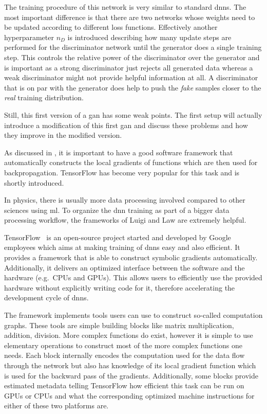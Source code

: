 The training procedure of this network is very similar to standard \glspl{dnn}. The most important difference is that there are two networks whose weights need to be updated according to different loss functions. Effectively another hyperparameter \(n_D\) is introduced describing how many update steps are performed for the discriminator network until the generator does a single training step. This controls the relative power of the discriminator over the generator and is important as a strong discriminator just rejects all generated data whereas a weak discriminator might not provide helpful information at all. A discriminator that is on par with the generator does help to push the \emph{fake} samples closer to the \emph{real} training distribution.

Still, this first version of a \gls{gan} has some weak points. The first setup will actually introduce a modification of this first \gls{gan} and discuss these problems and how they improve in the modified version.

\label{ssec:software}

As discussed in , it is important to have a good software framework that automatically constructs the local gradients of functions which are then used for backpropagation. TensorFlow has become very popular for this task and is shortly introduced.

In physics, there is usually more data processing involved compared to other sciences using \gls{ml}. To organize the \gls{dnn} training as part of a bigger data processing workflow, the frameworks of Luigi and Law are extremely helpful.


TensorFlow~\cite{tf} is an open-source project started and developed by Google employees which aims at making training of \glspl{dnn} easy and also efficient. It provides a framework that is able to construct symbolic gradients automatically. Additionally, it delivers an optimized interface between the software and the hardware (e.g.\ CPUs and GPUs). This allows users to efficiently use the provided hardware without explicitly writing code for it, therefore accelerating the development cycle of \glspl{dnn}.

The framework implements tools users can use to construct so-called computation graphs. These tools are simple building blocks like matrix multiplication, addition, division. More complex functions do exist, however it is simple to use elementary operations to construct most of the more complex functions one needs. Each block internally encodes the computation used for the data flow through the network but also has knowledge of its local gradient function which is used for the backward pass of the gradients. Additionally, some blocks provide estimated metadata telling TensorFlow how efficient this task can be run on GPUs or CPUs and what the corresponding optimized machine instructions for either of these two platforms are.

